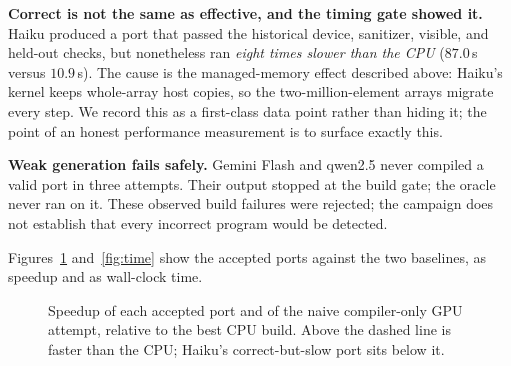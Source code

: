 \documentclass[11pt]{article}
\begin{document}
\textbf{Correct is not the same as effective, and the timing gate showed it.}
Haiku produced a port that passed the historical device, sanitizer, visible,
and held-out checks, but nonetheless ran
\emph{eight times slower than the CPU} ($87.0$\,s versus $10.9$\,s). The cause is
the managed-memory effect described above: Haiku's kernel keeps whole-array host
copies, so the two-million-element arrays migrate every step. We record this as
a first-class data point rather than hiding it; the point of an honest
performance measurement is to surface exactly this.

\textbf{Weak generation fails safely.} Gemini Flash and qwen2.5 never compiled a
valid port in three attempts. Their output stopped at the build gate; the oracle
never ran on it. These observed build failures were rejected; the campaign does
not establish that every incorrect program would be detected.

Figures~\ref{fig:speedup} and~\ref{fig:time} show the accepted ports against the
two baselines, as speedup and as wall-clock time.

\begin{figure}[htbp]
\centering
{}
\caption{Speedup of each accepted port and of the naive compiler-only GPU
attempt, relative to the best CPU build. Above the dashed line is faster than the
CPU; Haiku's correct-but-slow port sits below it.}
\label{fig:speedup}
\end{figure}
\end{document}
